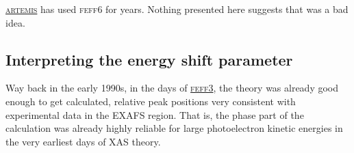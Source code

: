 \documentclass[11pt]{article}
\begin{document}
\href{http://bruceravel.github.io/demeter/}{\textsc{artemis}} has used
\textsc{feff6} for years. Nothing presented here suggests that was a
bad idea.






\subsection{Interpreting the energy shift parameter}
\label{sec:orgheadline45}

Way back in the early 1990s, in the days of
\href{http://dx.doi.org/10.1103/PhysRevB.44.4146}{\textsc{feff3}}, the
theory was already good enough to get calculated, relative peak
positions very consistent with experimental data in the EXAFS
region. That is, the phase part of the calculation was already highly
reliable for large photoelectron kinetic energies in the very earliest
days of XAS theory.
\end{document}
